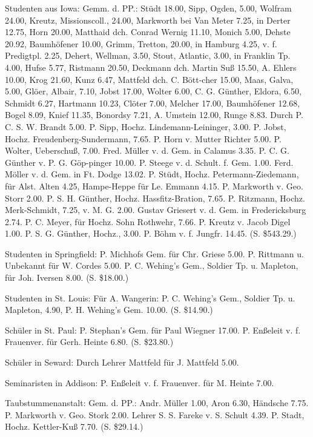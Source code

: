 Studenten aus Iowa: Gemm. d. PP.: Stüdt 18.00, Sipp, Ogden, 5.00, Wolfram 24.00, Kreutz, Missionscoll., 24.00, Markworth bei Van Meter 7.25, in Derter 12.75, Horn 20.00, Matthaid dch. Conrad Wernig 11.10, Monich 5.00, Dehste 20.92, Baumhöfener 10.00, Grimm, Tretton, 20.00, in Hamburg 4.25, v. f. Predigtpl. 2.25, Dehert, Wellman, 3.50, Stout, Atlantic, 3.00, in Franklin Tp. 4.00, Hufse 5.77, Ristmann 20.50, Deckmann dch. Martin Suß 15.50, A. Ehlers 10.00, Krog 21.60, Kunz 6.47, Mattfeld dch. C. Bött-cher 15.00, Maas, Galva, 5.00, Glöer, Albair, 7.10, Jobst 17.00, Wolter 6.00, C. G. Günther, Eldora, 6.50, Schmidt 6.27, Hartmann 10.23, Clöter 7.00, Melcher 17.00, Baumhöfener 12.68, Bogel 8.09, Knief 11.35, Bonordsy 7.21, A. Umstein 12.00, Runge 8.83. Durch P. C. S. W. Brandt 5.00. P. Sipp, Hochz. Lindemann-Leininger, 3.00. P. Jobst, Hochz. Freudenberg-Sundermann, 7.65. P. Horn v. Mutter Richter 5.00. P. Wolter, Ueberschuß, 7.00. Fred. Müller v. d. Gem. in Calamus 3.35. P. C. G. Günther v. P. G. Göp-pinger 10.00. P. Steege v. d. Schult. f. Gem. 1.00. Ferd. Möller v. d. Gem. in Ft. Dodge 13.02. P. Stüdt, Hochz. Petermann-Ziedemann, für Alst. Alten 4.25, Hampe-Heppe für Le. Emmann 4.15. P. Markworth v. Geo. Storr 2.00. P. S. H. Günther, Hochz. Hassfitz-Bration, 7.65. P. Ritzmann,
Hochz. Merk-Schmidt, 7.25, v. M. G. 2.00. Gustav Griesert v. d. Gem. in Fredericksburg 2.74. P. C. Meyer, für Hochz. Sohn Rothwehr, 7.66. P. Kreutz v. Jacob Digel 1.00. P. S. G. Günther, Hochz., 3.00. P. Böhm v. f. Jungfr. 14.45. (S. \$543.29.)

Studenten in Springfield: P. Michhofs Gem. für Chr. Griese 5.00. P. Rittmann u. Unbekannt für W. Cordes 5.00. P. C. Wehing’s Gem., Soldier Tp. u. Mapleton, für Joh. Iversen 8.00. (S. \$18.00.)

Studenten in St. Louis: Für A. Wangerin: P. C. Wehing’s Gem., Soldier Tp. u. Mapleton, 4.90, P. H. Wehing’s Gem. 10.00. (S. \$14.90.)

Schüler in St. Paul: P. Stephan’s Gem. für Paul Wiegner 17.00. P. Enßeleit v. f. Frauenver. für Gerh. Heinte 6.80. (S. \$23.80.)

Schüler in Seward: Durch Lehrer Mattfeld für J. Mattfeld 5.00.

Seminaristen in Addison: P. Enßeleit v. f. Frauenver. für M. Heinte 7.00.

Taubstummenanstalt: Gem. d. PP.: Andr. Müller 1.00, Aron 6.30, Händsche 7.75. P. Markworth v. Geo. Stork 2.00. Lehrer S. S. Fareke v. S. Schult 4.39. P. Stadt, Hochz. Kettler-Kuß 7.70. (S. \$29.14.)

